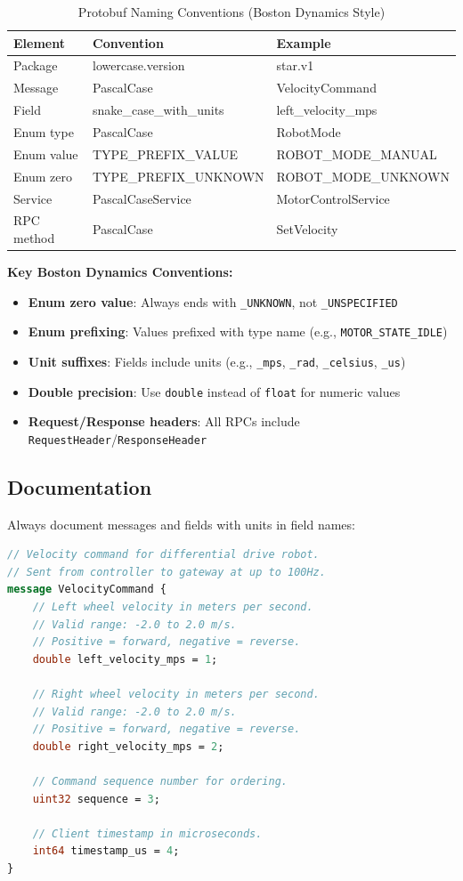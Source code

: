 \begin{table}[H]
\centering
\begin{tabular}{|l|l|l|}
\hline
\textbf{Element} & \textbf{Convention} & \textbf{Example} \\
\hline
Package & lowercase.version & star.v1 \\
Message & PascalCase & VelocityCommand \\
Field & snake\_case\_with\_units & left\_velocity\_mps \\
Enum type & PascalCase & RobotMode \\
Enum value & TYPE\_PREFIX\_VALUE & ROBOT\_MODE\_MANUAL \\
Enum zero & TYPE\_PREFIX\_UNKNOWN & ROBOT\_MODE\_UNKNOWN \\
Service & PascalCaseService & MotorControlService \\
RPC method & PascalCase & SetVelocity \\
\hline
\end{tabular}
\caption{Protobuf Naming Conventions (Boston Dynamics Style)}
\end{table}

\textbf{Key Boston Dynamics Conventions:}
\begin{itemize}
    \item \textbf{Enum zero value}: Always ends with \texttt{\_UNKNOWN}, not \texttt{\_UNSPECIFIED}
    \item \textbf{Enum prefixing}: Values prefixed with type name (e.g., \texttt{MOTOR\_STATE\_IDLE})
    \item \textbf{Unit suffixes}: Fields include units (e.g., \texttt{\_mps}, \texttt{\_rad}, \texttt{\_celsius}, \texttt{\_us})
    \item \textbf{Double precision}: Use \texttt{double} instead of \texttt{float} for numeric values
    \item \textbf{Request/Response headers}: All RPCs include \texttt{RequestHeader}/\texttt{ResponseHeader}
\end{itemize}

\subsection{Documentation}

Always document messages and fields with units in field names:

\begin{lstlisting}[language=Protobuf]
// Velocity command for differential drive robot.
// Sent from controller to gateway at up to 100Hz.
message VelocityCommand {
    // Left wheel velocity in meters per second.
    // Valid range: -2.0 to 2.0 m/s.
    // Positive = forward, negative = reverse.
    double left_velocity_mps = 1;

    // Right wheel velocity in meters per second.
    // Valid range: -2.0 to 2.0 m/s.
    // Positive = forward, negative = reverse.
    double right_velocity_mps = 2;

    // Command sequence number for ordering.
    uint32 sequence = 3;

    // Client timestamp in microseconds.
    int64 timestamp_us = 4;
}
\end{lstlisting}


